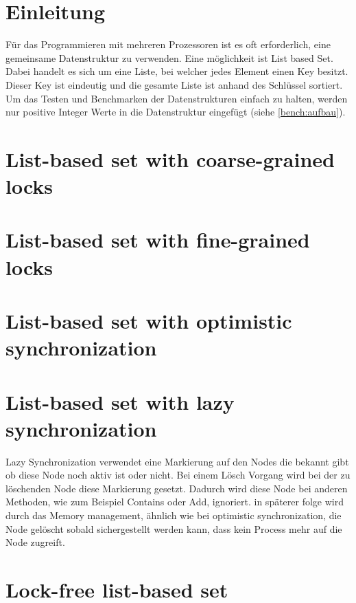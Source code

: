 \documentclass[10pt,a4paper,titlepage,oneside]{article}
\begin{document}
 

\maketitle  
 
\tableofcontents
\newpage  
\section{Einleitung}
Für das Programmieren mit mehreren Prozessoren ist es oft erforderlich, eine gemeinsame Datenstruktur zu verwenden. 
Eine möglichkeit ist List based Set. Dabei handelt es sich um eine Liste, bei welcher jedes Element einen Key besitzt.
Dieser Key ist eindeutig und die gesamte Liste ist anhand des Schlüssel sortiert. 
Um das Testen und Benchmarken der Datenstrukturen einfach zu halten, werden nur positive Integer Werte in die Datenstruktur
eingefügt (siehe \ref{bench:aufbau}).

\section{List-based set with coarse-grained locks}
\section{List-based set with fine-grained locks}
\section{List-based set with optimistic synchronization}
\section{List-based set with lazy synchronization}

Lazy Synchronization verwendet eine Markierung auf den Nodes die bekannt gibt ob diese Node noch aktiv ist oder nicht. Bei einem Lösch Vorgang wird bei der zu löschenden Node diese Markierung gesetzt. Dadurch wird diese Node bei anderen Methoden, wie zum Beispiel Contains oder Add, ignoriert. in späterer folge wird durch das Memory management, ähnlich wie bei optimistic synchronization, die Node gelöscht sobald sichergestellt werden kann, dass kein Process mehr auf die Node zugreift.

\section{Lock-free list-based set}
\end{document}
